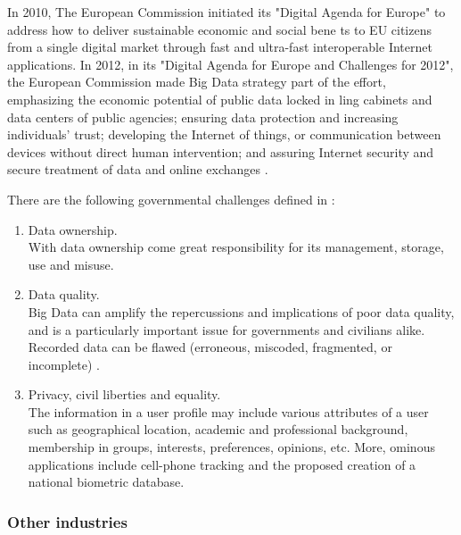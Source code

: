 \documentclass[runningheads]{llncs}
\begin{document}
In 2010, The European Commission initiated its "Digital Agenda for Europe" to address how to deliver sustainable economic and
social bene ts to EU citizens from a single digital market through fast and ultra-fast interoperable Internet applications. In 2012, in its "Digital Agenda for Europe and Challenges for 2012", the European Commission made Big Data strategy part of the effort, emphasizing the economic potential of public data locked in  ling cabinets and data centers of public agencies; ensuring data protection and increasing individuals' trust; developing the Internet of things, or communication between devices without direct human intervention; and assuring Internet security and secure treatment of data and online exchanges \cite{ACM}.

There are the following governmental challenges defined in \cite{MORABITO}:

\begin{enumerate}

\item Data ownership.\\

With data ownership come great responsibility for its management, storage, use and misuse.\\

\item Data quality.\\

Big Data can amplify the repercussions and implications of poor data quality, and is a particularly important issue for governments and civilians alike. Recorded data can be flawed (erroneous, miscoded, fragmented, or incomplete) \cite{MORABITO}.\\

\item Privacy, civil liberties and equality.\\

The information in a user profile may include various attributes of a user such as geographical location, academic and professional background, membership in groups, interests, preferences, opinions, etc. More, ominous applications include cell-phone tracking and the proposed creation of a national biometric database.

\end{enumerate}

\subsubsection{Other industries}
\end{document}

